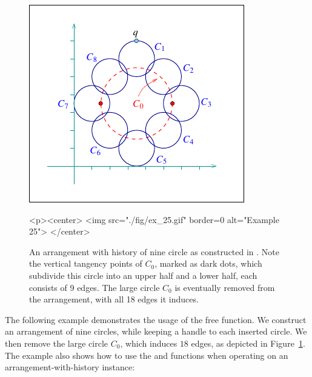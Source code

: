 
\begin{figure}[t]
\begin{ccTexOnly}
  \begin{center}
  \includegraphics{Arrangement_2/fig/ex_25}
  \end{center}
\end{ccTexOnly}
\begin{ccHtmlOnly}
  <p><center>
  <img src="./fig/ex_25.gif" border=0 alt="Example 25">
  </center>
\end{ccHtmlOnly}
\caption{An arrangement with history of nine circle as constructed in 
. Note the vertical tangency points
of $C_0$, marked as dark dots, which subdivide this circle into an upper half
and a lower half, each consists of 9 edges. The large circle $C_0$ is
eventually removed from the arrangement, with all 18 edges it
induces.\label{arr_fig:ex_25}}
\end{figure}

The following example demonstrates the usage of the free 
function. We construct an arrangement of nine circles, while keeping a handle
to each inserted circle. We then remove the large circle $C_0$, which induces
$18$ edges, as depicted in Figure~\ref{arr_fig:ex_25}. The example also shows
how to use the  and  functions when
operating on an arrangement-with-history instance:

